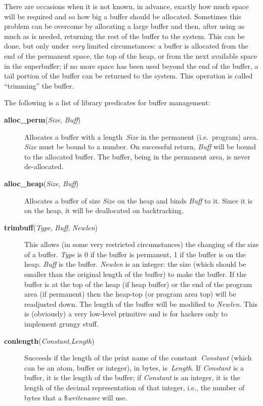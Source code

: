 There are occasions when it is not known, in advance, exactly how much
space will be required and so how big a buffer should be allocated.
Sometimes this problem can be overcome by allocating a large buffer and then,
after using as much as is needed,
returning the rest of the buffer to the system.
This can be done, but only under {\em very} limited circumstances:
a buffer is allocated from the end of the permanent space,
the top of the heap,
or from the next available space in the superbuffer;
if no more space has been used beyond the end of the buffer,
a tail portion of the buffer can be returned to the system.
This operation is called ``trimming'' the buffer.

The following is a list of library predicates for buffer management:

\begin{description}
\item[{\bf alloc\_perm}({\em Size}, {\em Buff})]
    Allocates a buffer with a length~{\em Size} in the permanent (i.e.\ program)
    area.
    {\em Size} must be bound to a number.
    On successful return, {\em Buff} will be bound to the allocated buffer.
    The buffer, being in the permanent area, is never de-allocated.

\item[{\bf alloc\_heap}({\em Size}, {\em Buff})]
    Allocates a buffer of size {\em Size} on the heap and binds {\em Buff}
    to it.
    Since it is on the heap, it will be deallocated on backtracking.

\item[{\bf trimbuff}({\em Type}, {\em Buff}, {\em Newlen})]
    This allows (in some very restricted circumstances) the changing of
    the size of a buffer.
    {\em Type} is 0 if the buffer is permanent, 1 if the buffer
    is on the heap.
    {\em Buff} is the buffer.
    {\em Newlen} is an integer: the size
    (which should be smaller than the original length of the buffer) to make
    the buffer.
    If the buffer is at the top of the heap (if heap buffer) or the
    end of the program area (if permanent) then the heap-top
    (or program area top) will be readjusted down.
    The length of the buffer will be modified to {\em Newlen}.
    This is (obviously) a very low-level
    primitive and is for hackers only to implement grungy stuff.

\item[{\bf conlength}({\em Constant},{\em Length})]
    Succeeds if the length of the print name of the constant~{\em Constant}
    (which can be an atom, buffer or integer), in bytes, is~{\em Length}.
    If {\em Constant} is a buffer, it is the length of the buffer;
    if {\em Constant} is an integer,
    it is the length of the decimal representation of that integer,
    i.e., the number of bytes that a \${\em writename} will use.
\end{description}


